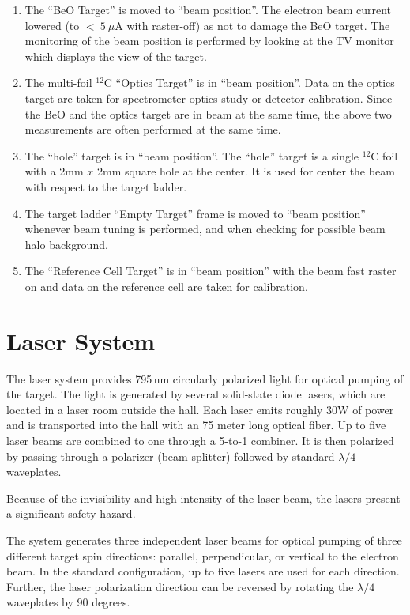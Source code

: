 {\begin{safetyen}{10}{5}
\begin{enumerate}
\item 
The ``BeO Target'' is moved to ``beam position''.
The electron beam current lowered (to $<~5~\mu$A with raster-off) 
as not to damage the 
BeO target.  The monitoring of the beam
position is performed by looking at the TV monitor which displays the
view of the target.

\item 
The multi-foil $^{12}$C ``Optics Target'' is in ``beam position''. Data on the optics
target are taken for spectrometer optics study or detector calibration.
Since the BeO and the optics target are in beam at the same time, the above 
two measurements are often performed at the same time.

\item
The ``hole'' target is in ``beam position''. The ``hole'' target is
a single $^{12}$C foil with a 2mm $x$ 2mm square hole at the center. It is used for
center the beam with respect to the target ladder.  

\item 
The target ladder ``Empty Target''
frame is moved to ``beam position'' whenever
beam tuning is performed, and when checking for possible beam halo
background.

\item  
The ``Reference Cell Target'' is in ``beam position'' with the beam fast
raster on and data on the reference cell are taken for calibration.


\end{enumerate}

\end{safetyen}
\section{Laser System}
\label{sec:lasers}

The laser system provides 795\,nm circularly polarized light for optical
pumping of the target. The light is generated by several solid-state
diode lasers, which are located in a laser room outside the hall.
Each laser emits roughly 30W of
power and is transported into the hall with an 75 meter long optical 
fiber. Up to five laser beams are combined to one through a 5-to-1 combiner.
It is then polarized by passing through a polarizer 
(beam splitter) followed by standard $\lambda/4$ waveplates.  
\begin{safetyen}{10}{5}
  Because of the invisibility and high intensity of the
laser beam, the lasers present a significant safety hazard.
\end{safetyen}
The system generates three independent laser beams for optical
pumping of three different target spin directions: parallel,
perpendicular, or vertical to the electron beam.  In the standard
configuration, up to five lasers are used for each direction.  
Further, the laser polarization direction can be reversed 
by rotating the $\lambda/4$ waveplates by 90 degrees.

}
